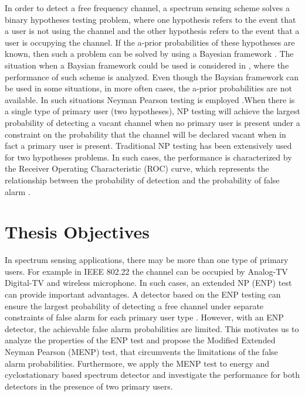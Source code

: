 In order to detect a free frequency channel, a spectrum sensing scheme solves a binary hypotheses testing problem, where one hypothesis refers to the event that a user is not using the channel and the other hypothesis refers to the event that a user is occupying the channel. If the a-prior probabilities of these hypotheses are known, then such a problem can be solved by using a Bayesian framework \cite{poor1994introduction}. The situation when a Baysian framework could be used is considered in \cite{zeng2010review}, where  the performance of such scheme is analyzed.
Even though the Baysian framework can be used in some situations, in more often cases, the a-prior probabilities are not available. In such situations Neyman Pearson testing is employed \cite{poor1994introduction}.When there is a single type of primary user (two hypotheses), NP testing will achieve the largest probability of detecting a vacant channel when no primary user is present under a constraint on the probability that the channel will be declared vacant when in fact a primary user is present.
Traditional NP testing has been extensively used for two hypotheses problems. In such cases,  the performance is characterized by the Receiver Operating Characteristic (ROC) curve, which represents the relationship between the probability of detection and the probability of false alarm \cite{poor1994introduction}. 

\section{Thesis Objectives}
In spectrum sensing applications, there may be more than one type of primary users. For example in IEEE 802.22  the channel can be occupied by Analog-TV Digital-TV and wireless microphone\cite{shellhammer2008spectrum}. 
In such cases, an extended NP (ENP) test  \cite{LehmannTest} can provide important advantages. A detector based on the ENP testing can ensure the largest probability of detecting a free channel under separate constraints of false alarm for each primary user type \cite{LehmannTest}.
However, with an ENP detector, the achievable false alarm probabilities are limited. This motivates us to analyze the properties of the ENP test and propose the Modified Extended Neyman Pearson (MENP) test, that circumvents the limitations of the false alarm probabilities. 
Furthermore, we apply the MENP test to energy and cyclostationary based spectrum detector and investigate the performance for both detectors in the presence of two primary users.


